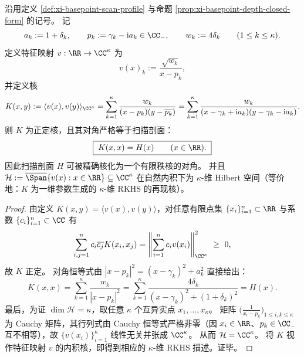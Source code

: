 \begin{theorem}\label{thm:xi-basepoint-scan-finite-rank-rkhs}
沿用定义 \ref{def:xi-basepoint-scan-profile} 与命题 \ref{prop:xi-basepoint-depth-closed-form} 的记号。
记
\[
a_k:=1+\delta_k,\qquad
p_k:=\gamma_k-\mathrm{i}a_k\in\CC_{-},\qquad
w_k:=4\delta_k\qquad(1\le k\le \kappa).
\]
定义特征映射 \(v:\RR\to\CC^{\kappa}\) 为
\[
v(x)_k:=\frac{\sqrt{w_k}}{x-p_k},
\]
并定义核
\[
K(x,y):=\langle v(x),v(y)\rangle_{\CC^{\kappa}}
=\sum_{k=1}^{\kappa}\frac{w_k}{(x-p_k)(y-\overline{p_k})}
=\sum_{k=1}^{\kappa}\frac{w_k}{(x-\gamma_k+\mathrm{i}a_k)(y-\gamma_k-\mathrm{i}a_k)}.
\]
则 \(K\) 为正定核，且其对角严格等于扫描剖面：
\[
\boxed{\;K(x,x)=H(x)\qquad(x\in\RR).\;}
\]
因此扫描剖面 \(H\) 可被精确核化为一个有限秩核的对角。
并且 \(\mathcal{H}:=\overline{\Span}\{v(x):x\in\RR\}\subseteq\CC^\kappa\) 在自然内积下为 \(\kappa\)-维 Hilbert 空间（等价地：\(K\) 为一维参数生成的 \(\kappa\)-维 RKHS 的再现核）。
\end{theorem}
\begin{proof}
由定义 \(K(x,y)=\langle v(x),v(y)\rangle\)，对任意有限点集 \(\{x_i\}_{i=1}^{n}\subset\RR\) 与系数 \(\{c_i\}_{i=1}^{n}\subset\CC\) 有
\[
\sum_{i,j=1}^{n}c_i\overline{c_j}K(x_i,x_j)
=\left\|\sum_{i=1}^{n}c_i v(x_i)\right\|_{\CC^\kappa}^2\ \ge\ 0,
\]
故 \(K\) 正定。
对角恒等式由 \(|x-p_k|^2=(x-\gamma_k)^2+a_k^2\) 直接给出：
\[
K(x,x)=\sum_{k=1}^{\kappa}\frac{w_k}{|x-p_k|^2}
=\sum_{k=1}^{\kappa}\frac{4\delta_k}{(x-\gamma_k)^2+(1+\delta_k)^2}
=H(x).
\]
最后，为证 \(\dim\mathcal{H}=\kappa\)，取任意 \(\kappa\) 个互异实点 \(x_1,\dots,x_\kappa\)。
矩阵 \(\bigl(\frac{1}{x_i-p_k}\bigr)_{1\le i,k\le\kappa}\) 为 Cauchy 矩阵，其行列式由 Cauchy 恒等式严格非零（因 \(x_i\in\RR\)、\(p_k\in\CC_{-}\) 互不相等），故 \(\{v(x_i)\}_{i=1}^{\kappa}\) 线性无关并张成 \(\CC^\kappa\)。
从而 \(\mathcal{H}=\CC^\kappa\)。
将 \(K\) 视作特征映射 \(v\) 的内积核，即得到相应的 \(\kappa\)-维 RKHS 描述。证毕。
\end{proof}

